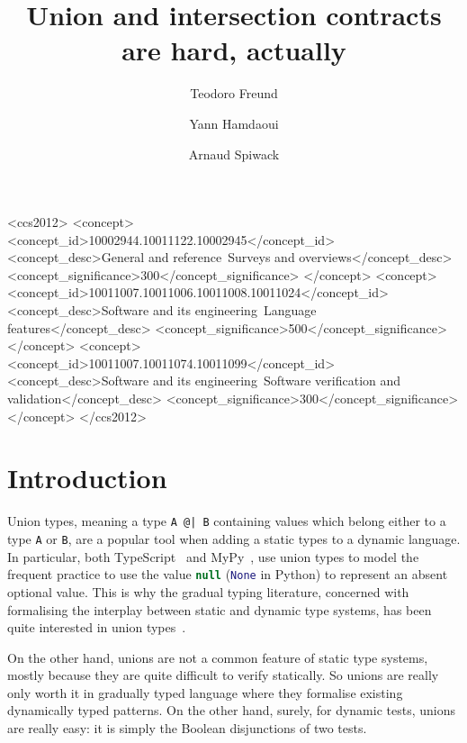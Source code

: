 \documentclass[sigplan,10pt,review,anonymous]{acmart}
\title{Union and intersection contracts are hard, actually}
\author{Teodoro Freund}
\affiliation{
  \institution{Universidad de Buenos Aires}
  \city{Buenos Aires}
  \country{Argentina}
}
\author{Yann Hamdaoui}
\affiliation{
  \institution{Tweag}
  \city{Paris}
  \country{France}
}
\author{Arnaud Spiwack}
\affiliation{
  \institution{Tweag}
  \city{Paris}
  \country{France}
}
\newcommand{\nickel}[1]{\lstinline[language=nickel]{#1}}
\newcommand{\typescript}[1]{\lstinline[language=JavaScript]{#1}}
\newcommand{\python}[1]{\lstinline[language=Python]{#1}}
\begin{document}
\begin{CCSXML}
<ccs2012>
   <concept>
       <concept_id>10002944.10011122.10002945</concept_id>
       <concept_desc>General and reference~Surveys and overviews</concept_desc>
       <concept_significance>300</concept_significance>
       </concept>
   <concept>
       <concept_id>10011007.10011006.10011008.10011024</concept_id>
       <concept_desc>Software and its engineering~Language features</concept_desc>
       <concept_significance>500</concept_significance>
       </concept>
   <concept>
       <concept_id>10011007.10011074.10011099</concept_id>
       <concept_desc>Software and its engineering~Software verification and validation</concept_desc>
       <concept_significance>300</concept_significance>
       </concept>
 </ccs2012>
\end{CCSXML}



\maketitle

\section{Introduction}
\label{sec:intro}

Union types, meaning a type \nickel{A @| B} containing values which
belong either to a type \nickel{A} or \nickel{B}, are a popular tool
when adding a static types to a dynamic language. In particular, both
TypeScript~\cite{TypeScriptUnions} and MyPy~\cite{MyPyOptional}, use
union types to model the frequent practice to use the value
\typescript{null} (\python{None} in Python) to represent an absent
optional value. This is why the gradual typing literature, concerned
with formalising the interplay between static and dynamic type
systems, has been quite interested in union
types~\cite{RootCauseOfBlame,KeilThiemannUnionIntersection}.

On the other hand, unions are not a common feature of static type
systems, mostly because they are quite difficult to verify
statically. So unions are really only worth it in gradually typed
language where they formalise existing dynamically typed patterns. On
the other hand, surely, for dynamic tests, unions are really easy: it
is simply the Boolean disjunctions of two tests.
\end{document}

